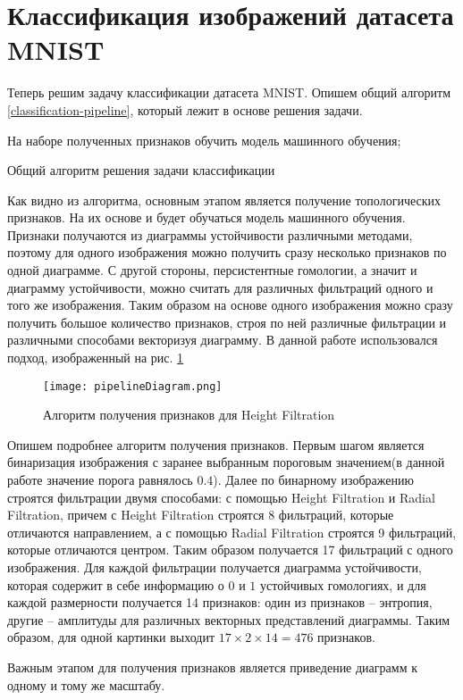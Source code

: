 \section{Классификация изображений датасета MNIST}

Теперь решим задачу классификации датасета MNIST. Опишем общий алгоритм \ref{classification-pipeline}, который лежит в основе решения задачи.

\medskip
\begin{algorithm}[H]
	\small
	\SetAlgoLined
	
	На наборе полученных признаков обучить модель машинного обучения;
	\caption{Общий алгоритм решения задачи классификации}
	\label{classification-pipeline}
\end{algorithm}
\medskip

Как видно из алгоритма, основным этапом является получение топологических признаков. На их основе и будет обучаться модель машинного обучения. Признаки получаются из диаграммы устойчивости различными методами, поэтому для одного изображения можно получить сразу несколько признаков по одной диаграмме. С другой стороны, персистентные гомологии, а значит и диаграмму устойчивости, можно считать для различных фильтраций одного и того же изображения. Таким образом на основе одного изображения можно сразу получить большое количество признаков, строя по ней различные фильтрации и различными способами векторизуя диаграмму. В данной работе использовался подход, изображенный на рис. \ref{pipeline}

\begin{figure}[!htbp]
	\begin{center}
		\texttt{[image: pipelineDiagram.png]}\\
		\caption{Алгоритм получения признаков для Height Filtration}
		\label{pipeline}
	\end{center}
\end{figure}

Опишем подробнее алгоритм получения признаков. Первым шагом является бинаризация изображения с заранее выбранным пороговым значением(в данной работе значение порога равнялось $0.4$). Далее по бинарному изображению строятся фильтрации двумя способами: с помощью Height Filtration и Radial Filtration, причем с Height Filtration строятся 8 фильтраций, которые отличаются направлением, а с помощью Radial Filtration строятся 9 фильтраций, которые отличаются центром. Таким образом получается 17 фильтраций с одного изображения. Для каждой фильтрации получается диаграмма устойчивости, которая содержит в себе информацию о $0$ и $1$ устойчивых гомологиях, и для каждой размерности получается 14 признаков: один из признаков -- энтропия, другие -- амплитуды для различных векторных представлений диаграммы. Таким образом, для одной картинки выходит $17 \times 2 \times 14 = 476$ признаков.

Важным этапом для получения признаков является приведение диаграмм к одному и тому же масштабу. 
